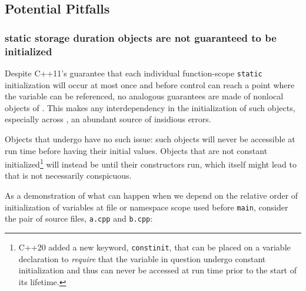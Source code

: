 \subsection[Potential Pitfalls]{Potential Pitfalls}\label{potential-pitfalls-functionstatic}

\subsubsection[\lstinline!static! storage duration objects are not guaranteed to be initialized]{{\SubsubsecCode static} storage duration objects are not guaranteed to be initialized}\label{static-storage duration-objects-are-not-guaranteed-to-be-initialized}

Despite C++11's guarantee that each individual function-scope
\lstinline!static! initialization will occur at most once and before control can reach
a point where the variable can be referenced, no analogous guarantees are made of nonlocal objects of .
This makes any interdependency in the initialization of such objects, especially across
, an abundant source of insidious
errors.

Objects that undergo  have no such issue:
such objects will never be accessible at run time before having their
initial values. Objects that are not constant
initialized{\cprotect\footnote{C++20 added a new keyword,
\lstinline!constinit!, that can be placed on a variable declaration to
\emph{require} that the variable in question undergo constant
initialization and thus can never be accessed at run time prior to the
  start of its lifetime.}} will instead be 
until their constructors run, which itself might lead to  that is not necessarily conspicuous.

\enlargethispage*{1ex}%
As a demonstration of what can happen when we depend on the relative
order of initialization of variables at file or
namespace scope used before \lstinline!main!, consider the
 pair of source files, \lstinline!a.cpp! and
\lstinline!b.cpp!:

